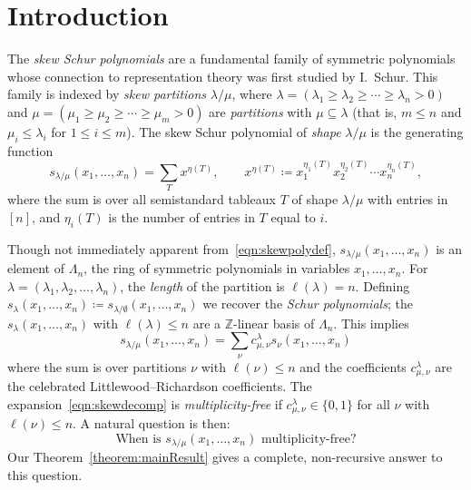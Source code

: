 \section{Introduction}\label{sec:intro}

The \emph{skew Schur polynomials} are a fundamental family of symmetric polynomials whose connection to representation theory was first studied by I.~Schur. This family is indexed by \emph{skew partitions} $\lambda / \mu$, where $\lambda = (\lambda_1 \geq \lambda_2 \geq \cdots \geq \lambda_n > 0)$ and $\mu = (\mu_1 \geq \mu_2 \geq \cdots \geq \mu_m > 0)$ are \emph{partitions} with $\mu \subseteq \lambda$ (that is, $m \leq n$ and $\mu_i \leq \lambda_i$ for $1\leq i \leq m$). The skew Schur polynomial of \emph{shape} $\lambda / \mu$ is the generating function
\begin{equation}
\label{eqn:skewpolydef}
s_{\lambda / \mu}(x_1,\ldots,x_n) = \sum_T x^{\eta(T)}, \qquad x^{\eta(T)}\coloneqq x_1^{\eta_1(T)}x_2^{\eta_2(T)}\cdots x_n^{\eta_n(T)},
\end{equation}
where the sum is over all semistandard tableaux $T$ of shape $\lambda / \mu$ with entries in $[n]$, and $\eta_i(T)$ is the number of entries in $T$ equal to $i$.

Though not immediately apparent from~\eqref{eqn:skewpolydef}, $s_{\lambda / \mu}(x_1,\ldots,x_n)$ is an element of $\Lambda_n$, the ring of symmetric polynomials in variables $x_1,\ldots,x_n$. For $\lambda = (\lambda_1, \lambda_2, \hdots ,\lambda_n )$, the \emph{length} of the partition is $\ell(\lambda) = n$. Defining $s_{\lambda}(x_1,\ldots,x_n) \coloneqq s_{\lambda / \emptyset}(x_1,\ldots,x_n)$ we recover the \emph{Schur polynomials}; the $s_{\lambda}(x_1,\ldots,x_n)$ with $\ell(\lambda) \leq n$ are a $\mathbb{Z}$-linear basis of $\Lambda_n$. This implies
\begin{equation}
\label{eqn:skewdecomp}
s_{\lambda / \mu}(x_1,\ldots,x_n) = \sum_\nu c_{\mu,\nu}^{\lambda} s_{\nu}(x_1,\ldots,x_n)
\end{equation}
where the sum is over partitions $\nu$ with $\ell(\nu) \leq n$ and the coefficients $c_{\mu,\nu}^{\lambda}$ are the celebrated Littlewood--Richardson coefficients. The expansion~\eqref{eqn:skewdecomp} is \emph{multiplicity-free} if $c_{\mu,\nu}^{\lambda} \in \{0,1\}$ for all $\nu$ with $\ell(\nu) \leq n$. A natural question is then: 
\[
\text{When is $s_{\lambda / \mu}(x_1,\ldots,x_n)$ multiplicity-free?}
\] 
Our Theorem~\ref{theorem:mainResult} gives a complete, non-recursive answer to this question.

